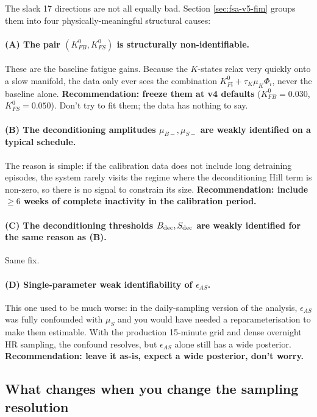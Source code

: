The slack 17 directions are not all equally bad. Section \ref{sec:fsa-v5-fim} groups them into four physically-meaningful structural causes:

\paragraph{(A) The pair $(K_{FB}^0, K_{FS}^0)$ is structurally non-identifiable.} These are the baseline fatigue gains. Because the $K$-states relax very quickly onto a slow manifold, the data only ever sees the combination $K_{Fi}^0 + \tau_K \mu_K \Phi_i$, never the baseline alone. \textbf{Recommendation: freeze them at v4 defaults} ($K_{FB}^0 = 0.030$, $K_{FS}^0 = 0.050$). Don't try to fit them; the data has nothing to say.

\paragraph{(B) The deconditioning amplitudes $\mu_{B-}, \mu_{S-}$ are weakly identified on a typical schedule.} The reason is simple: if the calibration data does not include long detraining episodes, the system rarely visits the regime where the deconditioning Hill term is non-zero, so there is no signal to constrain its size. \textbf{Recommendation: include $\ge 6$ weeks of complete inactivity in the calibration period.}

\paragraph{(C) The deconditioning thresholds $B_{\rm dec}, S_{\rm dec}$ are weakly identified for the same reason as (B).} Same fix.

\paragraph{(D) Single-parameter weak identifiability of $\epsilon_{AS}$.} This one used to be much worse: in the daily-sampling version of the analysis, $\epsilon_{AS}$ was fully confounded with $\mu_S$ and you would have needed a reparameterisation to make them estimable. With the production 15-minute grid and dense overnight HR sampling, the confound resolves, but $\epsilon_{AS}$ alone still has a wide posterior. \textbf{Recommendation: leave it as-is, expect a wide posterior, don't worry.}

\subsection{What changes when you change the sampling resolution}

